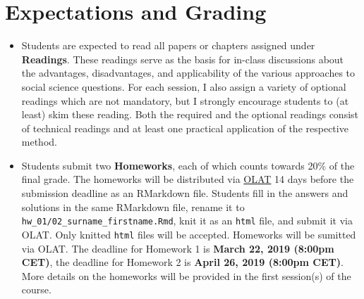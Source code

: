 \documentclass[abstract=on,parskip=full,headings=standardclasses,fontsize=11pt,paper=a4]{scrartcl}
\begin{document}
\section*{Expectations and Grading}


\begin{itemize}
\item Students are expected to read all papers or chapters assigned under \textbf{Readings}. These readings serve as the basis for in-class discussions about the advantages, disadvantages, and applicability of the various approaches to social science questions. For each session, I also assign a variety of optional readings which are not mandatory, but I strongly encourage students to (at least) skim these reading. Both the required  and the optional readings consist of technical  readings and at least one practical application of the respective method.
\item Students submit two \textbf{Homeworks}, each of which counts towards  20\% of the final grade. The homeworks will be distributed via \href{https://lms.uzh.ch/url/RepositoryEntry/16539681118?guest=true&lang=en}{OLAT} 14 days before the submission deadline as an RMarkdown file. Students fill in the answers and solutions in the same RMarkdown file, rename it  to \texttt{hw\_01/02\_surname\_firstname.Rmd}, knit it as an \texttt{html} file, and submit it via OLAT. Only knitted \texttt{html} files will be accepted. Homeworks will be sumitted via OLAT. The deadline for Homework 1 is \textbf{March 22, 2019 (8:00pm CET)}, the deadline for Homework 2 is \textbf{April 26, 2019 (8:00pm CET)}. More details on the homeworks will be provided in the first session(s) of the course. 

\end{itemize}
\end{document}
